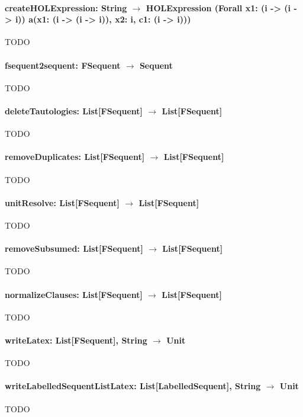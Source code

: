 \documentclass[a4paper, 11pt]{report}
\begin{document}
\paragraph{\textbf{createHOLExpression: String $\rightarrow$ HOLExpression
(Forall x1: (i -> (i -> i)) a(x1: (i -> (i -> i)), x2: i, c1: (i -> i)))}}
{\color{red}TODO}

\paragraph{\textbf{fsequent2sequent: FSequent $\rightarrow$ Sequent}}
{\color{red}TODO}

\paragraph{\textbf{deleteTautologies: List[FSequent] $\rightarrow$ List[FSequent]}}
{\color{red}TODO}

\paragraph{\textbf{removeDuplicates: List[FSequent] $\rightarrow$ List[FSequent]}}
{\color{red}TODO}

\paragraph{\textbf{unitResolve: List[FSequent] $\rightarrow$ List[FSequent]}}
{\color{red}TODO}

\paragraph{\textbf{removeSubsumed: List[FSequent] $\rightarrow$ List[FSequent]}}
{\color{red}TODO}

\paragraph{\textbf{normalizeClauses: List[FSequent] $\rightarrow$ List[FSequent]}}
{\color{red}TODO}

\paragraph{\textbf{writeLatex: List[FSequent], String $\rightarrow$ Unit}}
{\color{red}TODO}

\paragraph{\textbf{writeLabelledSequentListLatex: List[LabelledSequent], String $\rightarrow$ Unit}}
{\color{red}TODO}
\end{document}
